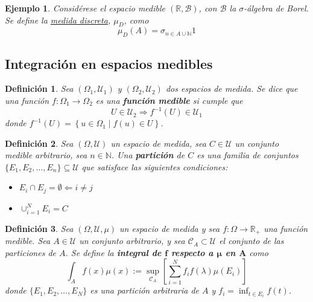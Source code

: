\documentclass[12pt,letterpaper]{book}
\newtheorem{definicion}{Definición}[chapter]
\newtheorem{ejemplo}{Ejemplo}[chapter]
\newcommand{\R}{\mathbb{R}}
\newcommand{\N}{\mathbb{N}}
\newcommand{\talque}{\mathrel{}\middle|\mathrel{}}
\begin{document}
\begin{ejemplo}
Considérese el espacio medible $(\R, \mathcal{B})$, con $\mathcal{B}$ la $\sigma$-álgebra de Borel. Se define la \ul{medida discreta}, $\mu_D$, como
\begin{equation}
\mu_D(A) = \sigma_{n \in A \cup \N} 1
\end{equation}
\end{ejemplo}


\subsection{Integración en espacios medibles}

\begin{definicion}
Sea $(\Omega_1, \mathcal{U}_1)$ y $(\Omega_2, \mathcal{U}_2)$ dos espacios de medida. Se dice que una función $f:\Omega_1\rightarrow\Omega_2$ es una \textbf{función medible} si cumple que
\begin{equation}
U \in \mathcal{U}_2 \Rightarrow f^{-1}(U) \in \mathcal{U}_1 
\end{equation}
donde $f^{-1}(U) = \left\{ u\in \Omega_1 \talque f(u) \in U \right\}$.
\end{definicion}

\begin{definicion}
Sea $(\Omega, \mathcal{U})$ un espacio de medida, sea $C \in \mathcal{U}$ un conjunto medible arbitrario, sea $n\in \N$. Una \textbf{partición} de $C$ es una familia de conjuntos $\{E_1, E_2, \dots, E_n\} \subseteq\mathcal{U}$ que satisface las siguientes condiciones:
\begin{itemize}
\item $E_i \cap E_j = \emptyset \Leftarrow i\neq j $
\item $\cup_{i=1}^{N}  E_i = C $
\end{itemize}
\end{definicion}

\begin{definicion}
Sea $(\Omega, \mathcal{U}, \mu)$ un espacio de medida y sea $f:\Omega \rightarrow \R_+$ una función medible. Sea $A\in \mathcal{U}$ un conjunto arbitrario, y sea $\mathcal{C}_A \subset \mathcal{U}$ el conjunto de las particiones de $A$.
Se define la \textbf{integral de $\boldsymbol{f}$ respecto a $\boldsymbol{\mu}$ en $\boldsymbol{A}$} como
\begin{equation}
\int_A f(x) \mu(x) := \sup_{\mathcal{C}_A} \left[ \sum_{i=1}^{N} f_i f(\lambda) \mu(E_i) \right]
\end{equation}
donde $\{ E_1, E_2, \dots, E_N \}$ es una partición arbitraria de $A$ y $f_i = \inf_{t \in E_i} f(t)$.
\label{def:lazy1}
\end{definicion}
\end{document}
